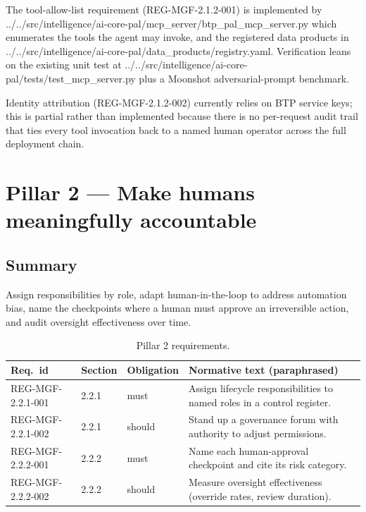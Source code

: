 \documentclass[11pt,a4paper,twoside]{report}
\newcommand{\corpus}{}
\begin{document}
The tool-allow-list requirement (REG-MGF-2.1.2-001) is implemented by
\corpus{../../src/intelligence/ai-core-pal/mcp\_server/btp\_pal\_mcp\_server.py}
which enumerates the tools the agent may invoke, and the registered data
products in
\corpus{../../src/intelligence/ai-core-pal/data\_products/registry.yaml}.
Verification leans on the existing unit test at
\corpus{../../src/intelligence/ai-core-pal/tests/test\_mcp\_server.py}
plus a Moonshot adversarial-prompt benchmark.

Identity attribution (REG-MGF-2.1.2-002) currently relies on BTP service
keys; this is partial rather than implemented because there is no
per-request audit trail that ties every tool invocation back to a named
human operator across the full deployment chain.

\section{Pillar 2 --- Make humans meaningfully accountable}
\label{sec:mgf-p2}

\subsection*{Summary}

Assign responsibilities by role, adapt human-in-the-loop to address
automation bias, name the checkpoints where a human must approve an
irreversible action, and audit oversight effectiveness over time.

\begin{table}[h]
\centering
\small
\begin{tabularx}{\textwidth}{p{3.2cm}p{1.4cm}p{1.6cm}X}
\toprule
\textbf{Req.\ id} & \textbf{Section} & \textbf{Obligation} & \textbf{Normative text (paraphrased)} \\
\midrule
REG-MGF-2.2.1-001 & 2.2.1 & must   & Assign lifecycle responsibilities to named roles in a control register. \\
REG-MGF-2.2.1-002 & 2.2.1 & should & Stand up a governance forum with authority to adjust permissions. \\
REG-MGF-2.2.2-001 & 2.2.2 & must   & Name each human-approval checkpoint and cite its risk category. \\
REG-MGF-2.2.2-002 & 2.2.2 & should & Measure oversight effectiveness (override rates, review duration). \\
\bottomrule
\end{tabularx}
\caption{Pillar 2 requirements.}
\label{tab:p2}
\end{table}
\end{document}
